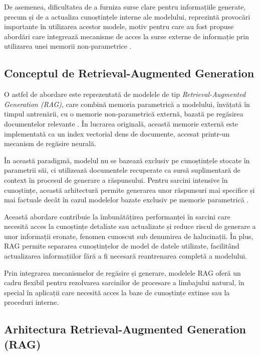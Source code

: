 \documentclass[12pt, a4paper, oneside, romanian]{teza-upb}
\begin{document}
De asemenea, dificultatea de a furniza surse clare pentru informațiile generate, precum și de a actualiza cunoștințele interne ale modelului, reprezintă provocări importante în utilizarea acestor modele, motiv pentru care au fost propuse abordări care integrează mecanisme de acces la surse externe de informație prin utilizarea unei memorii non-parametrice \cite{lewis2020retrieval}.



\subsection{Conceptul de Retrieval-Augmented Generation}

O astfel de abordare este reprezentată de modelele de tip \textit{Retrieval-Augmented Generation (RAG)}, care combină memoria parametrică a modelului, învățată în timpul antrenării, cu o memorie non-parametrică externă, bazată pe regăsirea documentelor relevante \cite{lewis2020retrieval}. În lucrarea originală, această memorie externă este implementată ca un index vectorial dens de documente, accesat printr-un mecanism de regăsire neurală.

În această paradigmă, modelul nu se bazează exclusiv pe cunoștințele stocate în parametrii săi, ci utilizează documentele recuperate ca sursă suplimentară de context în procesul de generare a răspunsului. Pentru sarcini intensive în cunoștințe, această arhitectură permite generarea unor răspunsuri mai specifice și mai factuale decât în cazul modelelor bazate exclusiv pe memorie parametrică \cite{lewis2020retrieval}.

Această abordare contribuie la îmbunătățirea performanței în sarcini care necesită acces la cunoștințe detaliate sau actualizate și reduce riscul de generare a unor informații eronate, fenomen cunoscut sub denumirea de halucinații. În plus, RAG permite separarea cunoștințelor de model de datele utilizate, facilitând actualizarea informațiilor fără a fi necesară reantrenarea completă a modelului.

Prin integrarea mecanismelor de regăsire și generare, modelele RAG oferă un cadru flexibil pentru rezolvarea sarcinilor de procesare a limbajului natural, în special în aplicații care necesită acces la baze de cunoștințe extinse \cite{lewis2020retrieval} sau la proceduri interne.


\subsection{Arhitectura Retrieval-Augmented Generation (RAG)}
\end{document}
